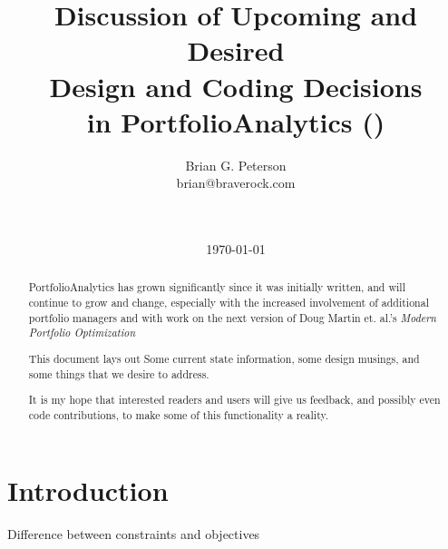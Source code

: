 \documentclass[12pt,letterpaper,english]{article}
\renewcommand{\baselinestretch}{1.3}
\begin{document}

\vspace{-2cm}
\renewcommand{\baselinestretch}{1}
\title{Discussion of Upcoming and Desired \\ Design and Coding Decisions \\ in PortfolioAnalytics (\citeyear{PortfolioAnalytics})}



\author{
Brian G. Peterson\\
brian@braverock.com \\ \\ \\ }

\date{\today}

\maketitle
\thispagestyle{empty} %

\renewcommand{\baselinestretch}{1}
\begin{abstract}
PortfolioAnalytics has grown significantly since it was initially written, and will continue to grow and change, especially with the increased involvement of additional portfolio managers and with work on the next version of Doug Martin et. al.'s \emph{Modern Portfolio Optimization}\citep{Scherer2005}

This document lays out Some current state information, some design musings, and some things that we desire to address.

It is my hope that interested readers and users will give us feedback, and possibly even code contributions, to make some of this functionality a reality.
\end{abstract}


\newpage
\renewcommand{\baselinestretch}{1.3}

\tableofcontents

\newpage

\section{Introduction}
Difference between constraints and objectives
\end{document}
